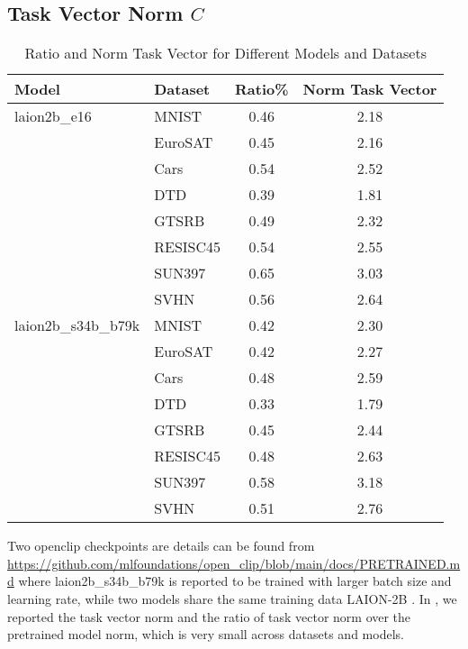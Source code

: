 \subsection{Task Vector Norm $C$}
\label{sec:norm_details}
\begin{table}[!ht]
\centering
\begin{tabular}{l l c c}
\toprule
\textbf{Model} & \textbf{Dataset} & \textbf{Ratio}\% & \textbf{Norm Task Vector} \\
\midrule
laion2b\_e16 & MNIST     & 0.46 & 2.18 \\
             & EuroSAT   & 0.45 & 2.16 \\
             & Cars      & 0.54 & 2.52 \\
             & DTD       & 0.39 & 1.81 \\
             & GTSRB     & 0.49 & 2.32 \\
             & RESISC45  & 0.54 & 2.55 \\
             & SUN397    & 0.65 & 3.03 \\
             & SVHN      & 0.56 & 2.64 \\
\midrule
laion2b\_s34b\_b79k & MNIST     & 0.42 & 2.30 \\
                    & EuroSAT   & 0.42 & 2.27 \\
                    & Cars      & 0.48 & 2.59 \\
                    & DTD       & 0.33 & 1.79 \\
                    & GTSRB     & 0.45 & 2.44 \\
                    & RESISC45  & 0.48 & 2.63 \\
                    & SUN397    & 0.58 & 3.18 \\
                    & SVHN      & 0.51 & 2.76 \\
\bottomrule
\end{tabular}
\caption{Ratio and Norm Task Vector for Different Models and Datasets}
\label{tab:ratio_norm_task}
\end{table}

Two openclip checkpoints are details can be found from \url{https://github.com/mlfoundations/open\_clip/blob/main/docs/PRETRAINED.md} where laion2b\_s34b\_b79k is reported to be trained with larger batch size and learning rate, while two models share the same training data LAION-2B \citep{schuhmann2022laionb}. In , we reported the task vector norm and the ratio of task vector norm over the pretrained model norm, which is very small across datasets and models.

